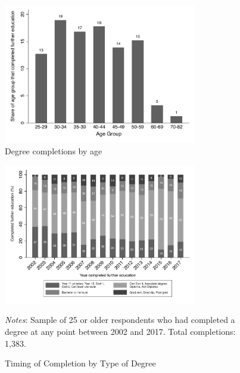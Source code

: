 \documentclass[12pt, a4paper]{article}
\begin{document}
\begin{figure}[H]
\centering
\caption{Degree completions by age}
\vspace{0.5cm}
  \label{fig:degbyage}
    \includegraphics[width=0.75\textwidth]{_figures/descriptive_fig3b_bw.pdf}
\end{figure}

\begin{figure}[H]
\centering
\caption{Timing of Completion by Type of Degree}
\vspace{0.5cm}
  \label{fig:yearcompdeg}
    \includegraphics[width=0.75\textwidth]{_figures/year_completed_bydegree.pdf}
\parbox{1\textwidth}{\footnotesize{\textit{Notes}: Sample of 25 or older respondents who had completed a degree at any point between 2002 and 2017. Total completions: 1,383.}}
\end{figure}

\end{document}
